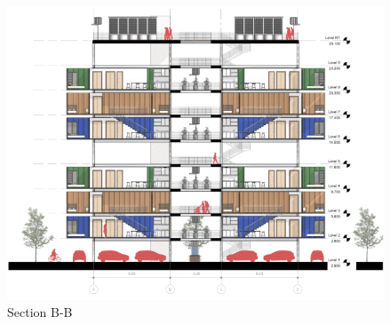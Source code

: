 ﻿%
\begin{figure}[H]
	\centering
	\includegraphics[width=\linewidth]{src/graphics/container-village--section-bb.jpg}
	\caption*{%
		Section B-B
	}
	\label{
		fig:container-village--section-bb
	}
\end{figure}

